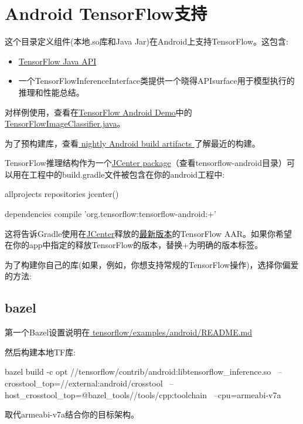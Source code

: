 \section{Android TensorFlow支持}
这个目录定义组件(本地.so库和Java Jar)在Android上支持TensorFlow。这包含:
\begin{itemize}
\item \href{https://github.com/tensorflow/tensorflow/blob/master/tensorflow/java/README.md}{TensorFlow Java API}
\item 一个TensorFlowInferenceInterface类提供一个晓得APIsurface用于模型执行的推理和性能总结。
\end{itemize}
对样例使用，查看在\href{https://github.com/tensorflow/tensorflow/blob/master/tensorflow/examples/android}{TensorFlow Android Demo}中的\href{https://github.com/tensorflow/tensorflow/blob/master/tensorflow/examples/android/src/org/tensorflow/demo/TensorFlowImageClassifier.java}{TensorFlowImageClassifier.java}。

为了预构建库，查看\href{https://ci.tensorflow.org/view/Nightly/job/nightly-android/}{ nightly Android build artifacts }了解最近的构建。

TensorFlow推理结构作为一个\href{https://bintray.com/google/tensorflow/tensorflow}{JCenter package}（查看tensorflow-android目录）可以用在工程中的build.gradle文件被包含在你的android工程中:
\begin{jsoncode}
allprojects {
    repositories {
        jcenter()
    }
}

dependencies {
    compile 'org.tensorflow:tensorflow-android:+'
}
\end{jsoncode}
这将告诉Gradle使用在\href{https://jcenter.bintray.com/org/tensorflow/tensorflow-android/}{JCenter}释放的\href{https://bintray.com/google/tensorflow/tensorflow/_latestVersion}{最新版本}的TensorFlow AAR。如果你希望在你的app中指定的释放TensorFlow的版本，替换+为明确的版本标签。

为了构建你自己的库(如果，例如，你想支持常规的TensorFlow操作)，选择你偏爱的方法:
\subsection{bazel}
第一个Bazel设置说明在\href{https://github.com/tensorflow/tensorflow/blob/master/tensorflow/examples/android/README.md}{ tensorflow/examples/android/README.md }

然后构建本地TF库:
\begin{bashcode}
bazel build -c opt //tensorflow/contrib/android:libtensorflow_inference.so \
   --crosstool_top=//external:android/crosstool \
   --host_crosstool_top=@bazel_tools//tools/cpp:toolchain \
   --cpu=armeabi-v7a
\end{bashcode}
取代armeabi-v7a结合你的目标架构。

